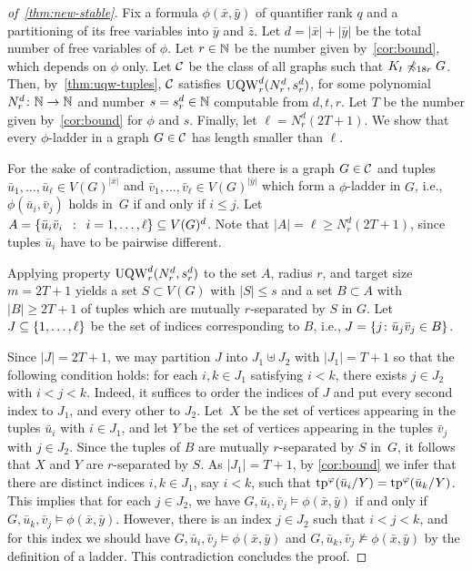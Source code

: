 \begin{proof}[of~\cref{thm:new-stable}]
Fix a formula $\phi(\bar x,\bar y)$ of quantifier rank $q$ and
a partitioning of its 
free variables into  $\bar y$ and $\bar z$.
Let $d=|\bar x|+|\bar y|$ be the total number of free variables of $\phi$.
Let $r\in \N$ be the number given by~\cref{cor:bound},
which depends on $\phi$ only.
Let $\cal C$ be the class of all graphs 
such that  $K_t\not\minor_{18r} G$.
Then, by~\cref{thm:uqw-tuples}, 
$\cal C$ satisfies $\uqw^d_{r}(N^d_{r},s^d_r)$,
for some  polynomial  $N^d_r\from\N\to\N$ and number $s=s^d_r\in \N$ computable from $d,t,r$.
Let $T$ be the number given by~\cref{cor:bound} for $\phi$ and $s$.
 Finally, let 
$\ell=N^d_r(2T+1)$.
We show that 
every $\phi$-ladder in a graph $G\in\cal C$ has length smaller than $\ell$.


For the sake of contradiction, assume that there is a graph $G\in\cal C$
and tuples $\bar u_1,\ldots,\bar u_\ell\in V(G)^{|\bar x|}$ and $ \bar v_1,\ldots, \bar v_\ell\in V(G)^{|\bar y|}$
which form a $\phi$-ladder in $G$, i.e., 
$\phi(\bar u_i,\bar v_j)$ holds in~$G$ if and only if $i\le j$.
	Let $A=\setof{ \bar u_i \bar v_i}{i=1,\ldots,\ell}\subset V(G)^d$. Note that $|A|=\ell\ge N^d_r(2T+1)$, since tuples $\bar u_i$ have to be pairwise different.
  
Applying property  $\uqw^d_r(N^d_r,s^d_r)$ to the set $A$, radius $r$, and target size $m=2T+1$
		 yields a set $S\subset V(G)$ with $|S|\le s$
	and a set $B\subset A$ with $|B|\geq 2T+1$ 
  of tuples which are  mutually $r$-separated by $S$  in $G$.
  Let $J\subseteq \set{1,\ldots,\ell}$
  be the set of indices corresponding to $B$,
  i.e., $J=\set{j\colon\bar u_j\bar v_j\in B}$.
  
  Since $|J|=2T+1$, we may partition $J$ into $J_1\uplus J_2$ with $|J_1|=T+1$ so that the following condition holds:
  for each $i,k\in J_1$ satisfying $i<k$, there exists $j\in J_2$ with $i<j<k$. Indeed, it suffices to order the indices of $J$ and put every second index to $J_1$, and every other to $J_2$.
  Let~$X$ be the set of vertices appearing in the tuples $\bar u_i$ with $i\in J_1$, and let $Y$ be the set of vertices appearing in the tuples $\bar v_j$ with $j\in J_2$.
  Since the tuples of $B$ are mutually $r$-separated by $S$ in~$G$, it follows that $X$ and $Y$ are $r$-separated by $S$.
  As $|J_1|=T+1$, by \cref{cor:bound} we infer that there are distinct indices $i,k\in J_1$, say $i<k$, such that $\tp^\phi(\bar u_i/Y)=
    \tp^\phi(\bar u_{k}/Y)$. This implies that for each $j\in J_2$, we have $G,\bar u_i,\bar v_j\models \phi(\bar x,\bar y)$ if and only if $G,\bar u_{k},\bar v_j\models \phi(\bar x,\bar y)$.
    However, there is an index $j\in J_2$ such that $i<j<k$, and for this index we should have $G,\bar u_i,\bar v_j\models \phi(\bar x,\bar y)$ and $G,\bar u_{k},\bar v_j\not\models \phi(\bar x,\bar y)$
    by the definition of a ladder. This contradiction concludes the proof.
\end{proof}
